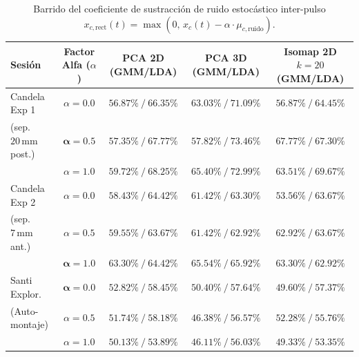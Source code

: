 \documentclass[11pt,a4paper]{article}
\begin{document}
\begin{table}[H]
\centering
\scriptsize
\begin{tabularx}{\textwidth}{p{2.5cm} c c c c}
\toprule
\textbf{Sesión} & \textbf{Factor Alfa ($\alpha$)} & \textbf{PCA 2D (GMM/LDA)} & \textbf{PCA 3D (GMM/LDA)} & \textbf{Isomap 2D $k=20$ (GMM/LDA)} \\
\midrule
Candela Exp 1 & $\alpha = 0.0$ & $56.87\% \ / \ 66.35\%$ & $63.03\% \ / \ 71.09\%$ & $56.87\% \ / \ 64.45\%$ \\
(sep. $20\,\text{mm}$ post.) & $\mathbf{\alpha = 0.5}$ & $57.35\% \ / \ 67.77\%$ & $57.82\% \ / \ \mathbf{73.46\%}$ & $\mathbf{67.77\%} \ / \ 67.30\%$ \\
              & $\alpha = 1.0$ & $\mathbf{59.72\%} \ / \ \mathbf{68.25\%}$ & $\mathbf{65.40\%} \ / \ 72.99\%$ & $63.51\% \ / \ \mathbf{69.67\%}$ \\
\midrule
Candela Exp 2 & $\alpha = 0.0$ & $58.43\% \ / \ 64.42\%$ & $61.42\% \ / \ 63.30\%$ & $53.56\% \ / \ 63.67\%$ \\
(sep. $7\,\text{mm}$ ant.)  & $\alpha = 0.5$ & $59.55\% \ / \ 63.67\%$ & $61.42\% \ / \ 62.92\%$ & $62.92\% \ / \ 63.67\%$ \\
              & $\mathbf{\alpha = 1.0}$ & $\mathbf{63.30\%} \ / \ \mathbf{64.42\%}$ & $\mathbf{65.54\%} \ / \ \mathbf{65.92\%}$ & $\mathbf{63.30\%} \ / \ 62.92\%$ \\
\midrule
Santi Explor. & $\mathbf{\alpha = 0.0}$ & $\mathbf{52.82\%} \ / \ \mathbf{58.45\%}$ & $\mathbf{50.40\%} \ / \ \mathbf{57.64\%}$ & $49.60\% \ / \ \mathbf{57.37\%}$ \\
(Auto-montaje)& $\alpha = 0.5$ & $51.74\% \ / \ 58.18\%$ & $46.38\% \ / \ 56.57\%$ & $\mathbf{52.28\%} \ / \ 55.76\%$ \\
              & $\alpha = 1.0$ & $50.13\% \ / \ 53.89\%$ & $46.11\% \ / \ 56.03\%$ & $49.33\% \ / \ 53.35\%$ \\
\bottomrule
\end{tabularx}
\caption{Barrido del coeficiente de sustracción de ruido estocástico inter-pulso $x_{c,\text{rect}}(t) = \max(0,\, x_c(t) - \alpha\cdot\mu_{c,\text{ruido}})$.}
\label{tab:barrido_alpha}
\end{table}
\end{document}
